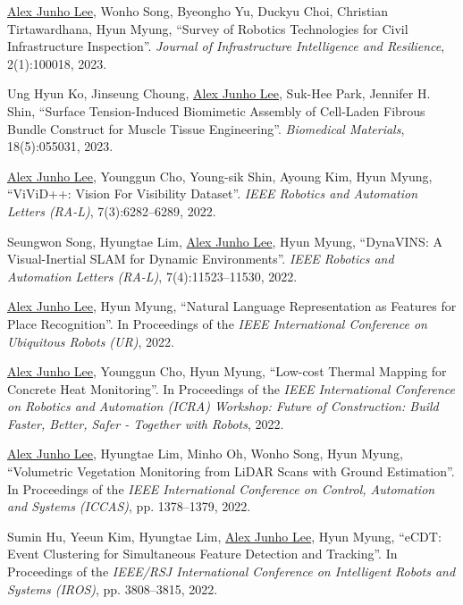 \documentclass[margin]{res}
\begin{document}
\begin{resume}
		\par\underline{Alex Junho Lee}, Wonho Song, Byeongho Yu, Duckyu Choi, Christian Tirtawardhana, Hyun Myung, ``Survey of Robotics Technologies for Civil Infrastructure Inspection''. \textit{Journal of Infrastructure Intelligence and Resilience}, 2(1):100018, 2023.

		\par Ung Hyun Ko, Jinseung Choung, \underline{Alex Junho Lee}, Suk-Hee Park, Jennifer H. Shin, ``Surface Tension-Induced Biomimetic Assembly of Cell-Laden Fibrous Bundle Construct for Muscle Tissue Engineering''. \textit{Biomedical Materials}, 18(5):055031, 2023.

		\par\underline{Alex Junho Lee}, Younggun Cho, Young-sik Shin, Ayoung Kim, Hyun Myung, ``ViViD++: Vision For Visibility Dataset''. \textit{IEEE Robotics and Automation Letters (RA-L)}, 7(3):6282--6289, 2022.

		\par Seungwon Song, Hyungtae Lim, \underline{Alex Junho Lee}, Hyun Myung, ``DynaVINS: A Visual-Inertial SLAM for Dynamic Environments''. \textit{IEEE Robotics and Automation Letters (RA-L)}, 7(4):11523--11530, 2022.

		\par\underline{Alex Junho Lee}, Hyun Myung, ``Natural Language Representation as Features for Place Recognition''. In Proceedings of the \textit{IEEE International Conference on Ubiquitous Robots (UR)}, 2022.

		\par\underline{Alex Junho Lee}, Younggun Cho, Hyun Myung, ``Low-cost Thermal Mapping for Concrete Heat Monitoring''. In Proceedings of the \textit{IEEE International Conference on Robotics and Automation (ICRA) Workshop: Future of Construction: Build Faster, Better, Safer - Together with Robots}, 2022.

		\par\underline{Alex Junho Lee}, Hyungtae Lim, Minho Oh, Wonho Song, Hyun Myung, ``Volumetric Vegetation Monitoring from LiDAR Scans with Ground Estimation''. In Proceedings of the \textit{IEEE International Conference on Control, Automation and Systems (ICCAS)}, pp. 1378--1379, 2022.

		\par Sumin Hu, Yeeun Kim, Hyungtae Lim, \underline{Alex Junho Lee}, Hyun Myung, ``eCDT: Event Clustering for Simultaneous Feature Detection and Tracking''. In Proceedings of the \textit{IEEE/RSJ International Conference on Intelligent Robots and Systems (IROS)}, pp. 3808--3815, 2022.


\end{resume}
\end{document}
